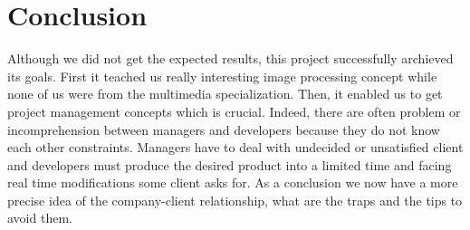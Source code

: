 
\section{Conclusion}
Although we did not get the expected results, this project successfully archieved its goals. First it teached us really interesting image processing concept while none of us were from the multimedia specialization. Then, it enabled us to get project management concepts which is crucial. Indeed, there are often problem or incomprehension between managers and developers because they do not know each other constraints. Managers have to deal with undecided or unsatisfied client and developers must produce the desired product into a limited time and facing real time modifications some client asks for. As a conclusion we now have a more precise idea of the company-client relationship, what are the traps and the tips to avoid them.



